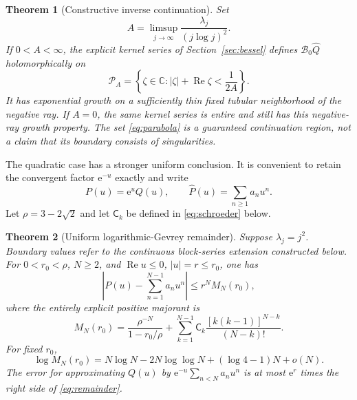 \documentclass[11pt,a4paper]{article}
\numberwithin{equation}{section}
\newtheorem{theorem}{Theorem}[section]
\theoremstyle{definition}
\theoremstyle{remark}
\newcommand{\C}{\mathbb C}
\newcommand{\Q}{\widehat Q}
\newcommand{\Pp}{\widehat P}
\newcommand{\B}{\mathcal B_0}
\newcommand{\ee}{\mathrm e}
\newcommand{\Ree}{\operatorname{Re}}
\newcommand{\sh}{\mathsf C}
\begin{document}
\begin{theorem}[Constructive inverse continuation]
\label{thm:borel}
Set
\begin{equation}
 A=\limsup_{j\to\infty}\frac{\lambda_j}{(j\log j)^2}.
 \label{eq:A}
\end{equation}
If $0<A<\infty$, the explicit kernel series of
Section~\ref{sec:bessel} defines $\B\Q$ holomorphically on
\begin{equation}
 \mathcal P_A=\left\{\zeta\in\C:
       |\zeta|+\Ree\zeta<\frac1{2A}\right\}.
 \label{eq:parabola}
\end{equation}
It has exponential growth on a sufficiently thin fixed tubular
neighborhood of the negative ray.  If $A=0$, the same kernel series is
entire and still has this negative-ray growth property.  The set
\eqref{eq:parabola} is a guaranteed continuation region, not a claim that
its boundary consists of singularities.
\end{theorem}

The quadratic case has a stronger uniform conclusion.  It is convenient
to retain the convergent factor $\ee^{-u}$ exactly and write
\begin{equation}
 P(u)=\ee^uQ(u),\qquad \Pp(u)=\sum_{n\ge1}a_nu^n.
 \label{eq:P}
\end{equation}
Let $\rho=3-2\sqrt2$ and let $\sh_k$ be defined in
\eqref{eq:schroeder} below.

\begin{theorem}[Uniform logarithmic-Gevrey remainder]
\label{thm:remainder}
Suppose $\lambda_j=j^2$.  Boundary values refer to the continuous
block-series extension constructed below.  For $0<r_0<\rho$, $N\ge2$, and
$\Ree u\le0$, $|u|=r\le r_0$, one has
\begin{equation}
 \left|P(u)-\sum_{n=1}^{N-1}a_nu^n\right|
 \le r^N M_N(r_0),
 \label{eq:remainder}
\end{equation}
where the entirely explicit positive majorant is
\begin{equation}
 M_N(r_0)=\frac{\rho^{-N}}{1-r_0/\rho}
 +\sum_{k=1}^{N-1}\sh_k
       \frac{[k(k-1)]^{N-k}}{(N-k)!}.
 \label{eq:MN}
\end{equation}
For fixed $r_0$,
\begin{equation}
 \log M_N(r_0)
 =N\log N-2N\log\log N+(\log4-1)N+o(N).
 \label{eq:MN-asymp}
\end{equation}
The error for approximating $Q(u)$ by
$\ee^{-u}\sum_{n<N}a_nu^n$ is at most $\ee^r$ times the right side of
\eqref{eq:remainder}.
\end{theorem}
\end{document}
